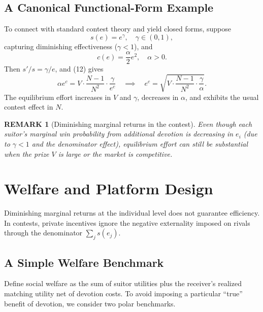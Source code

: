 \documentclass[AER]{AEA}
\newtheorem{remark}{REMARK}
\begin{document}
\subsection{A Canonical Functional-Form Example}

To connect with standard contest theory and yield closed forms, suppose
\begin{equation}
  s(e) = e^\gamma, \quad \gamma \in (0, 1),
\end{equation}
capturing diminishing effectiveness ($\gamma < 1$), and
\begin{equation}
  c(e) = \frac{\alpha}{2} e^2, \quad \alpha > 0.
\end{equation}
Then $s'/s = \gamma/e$, and (12) gives
\begin{equation}
  \alpha e^c = V \cdot \frac{N-1}{N^2} \cdot \frac{\gamma}{e^c}
  \quad\implies\quad
  e^c = \sqrt{V \cdot \frac{N-1}{N^2} \cdot \frac{\gamma}{\alpha}}.
\end{equation}
The equilibrium effort increases in $V$ and $\gamma$, decreases in $\alpha$, and exhibits
the usual contest effect in $N$.

\begin{remark}[Diminishing marginal returns in the contest]\label{rem:contest_dmr}
  Even though each suitor's marginal win probability from additional devotion is decreasing
  in $e_i$ (due to $\gamma < 1$ and the denominator effect), equilibrium effort can still
  be substantial when the prize $V$ is large or the market is competitive.
\end{remark}

\section{Welfare and Platform Design}

Diminishing marginal returns at the individual level does not guarantee efficiency. In
contests, private incentives ignore the negative externality imposed on rivals through the
denominator $\sum_j s(e_j)$.

\subsection{A Simple Welfare Benchmark}

Define social welfare as the sum of suitor utilities plus the receiver's realized matching
utility net of devotion costs. To avoid imposing a particular ``true'' benefit of
devotion, we consider two polar benchmarks.
\end{document}
